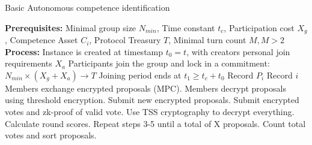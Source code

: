 
\begin{algorithm}
    \caption{Basic Autonomous competence identification}
    \label{algo:basic-acid}
    \begin{algorithmic}[1] %
        \State \textbf{Prerequisites:} Minimal group size $N_{min}$, Time constant $t_{c}$, Participation cost $X_g$, Competence Asset $C_i$, Protocol Treasury $T$, Minimal turn count ${M, M > 2}$
        \State \textbf{Process:}
        \State Instance is created at timestamp $t_0=t$, with creators personal join requirements $X_a$
        \State Participants join the group and lock in a commitment: $N_{min} \times (X_g+X_a) \rightarrow T$
        \State Joining period ends at $t_1  \ge t_c + t_0$
        \EndProcedure
        \State Record ${P_i}$
        \State Record $i$
        \EndIf
        \EndWhile
        \State Members exchange encrypted proposals (MPC).
        \EndIf
        \EndProcedure
        \State Members decrypt proposals using threshold encryption.
        \EndIf
        \EndProcedure
        \State Submit new encrypted proposals.
        \State Submit encrypted votes and zk-proof of valid vote.
        \EndProcedure
        \State Use TSS cryptography to decrypt everything.
        \State Calculate round scores.
        \EndIf
        \EndProcedure
        \State Repeat steps 3-5 until a total of X proposals.
        \EndProcedure
        \State Count total votes and sort proposals.
        \EndProcedure
    \end{algorithmic}
\end{algorithm}

